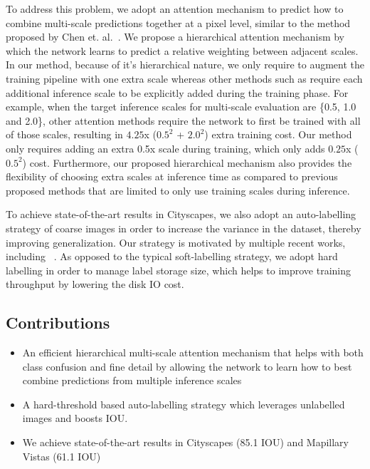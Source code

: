 \documentclass{article}
\begin{document}
To address this problem, we adopt an attention mechanism to predict how to combine multi-scale predictions together at a pixel level, similar to the method proposed by Chen et. al.~\cite{chen2015attention}. We propose a hierarchical attention mechanism by which the network learns to predict a relative weighting between adjacent scales. In our method, because of it's hierarchical nature, we only require to augment the training pipeline with one extra scale whereas other methods such as \cite{chen2015attention} require each additional inference scale to be explicitly added during the training phase. For example, when the target inference scales for multi-scale evaluation are \{0.5, 1.0 and 2.0\}, other attention methods require the network to first be trained with all of those scales, resulting in $4.25$x ($0.5^2$ + $2.0^2$) extra training cost.  Our method only requires adding an extra 0.5x scale during training, which only adds $0.25$x ($0.5^2$) cost. Furthermore, our proposed hierarchical mechanism also provides the flexibility of choosing extra scales at inference time as compared to previous proposed methods that are limited to only use training scales during inference.

To achieve state-of-the-art results in Cityscapes, we also adopt an auto-labelling strategy of coarse images in order to increase the variance in the dataset, thereby improving generalization. Our strategy is motivated by multiple recent works, including ~\cite{xie2019selftraining,arazo2019pseudo,lee2013pseudo}. As opposed to the typical soft-labelling strategy, we adopt hard labelling in order to manage label storage size, which helps to improve training throughput by lowering the disk IO cost.


\subsection{Contributions}
\begin{itemize}
\item An efficient hierarchical multi-scale attention mechanism that helps with both class confusion and fine detail by allowing the network to learn how to best combine predictions from multiple inference scales
\item A hard-threshold based auto-labelling strategy which leverages unlabelled images and boosts IOU.
\item We achieve state-of-the-art results in Cityscapes (85.1 IOU) and Mapillary Vistas (61.1 IOU)
\end{itemize}
\end{document}
